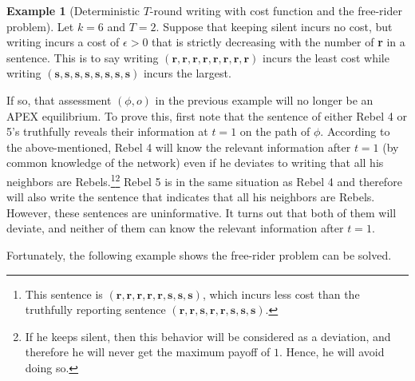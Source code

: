 \documentclass[12pt,letter]{article}
\newcommand\omicron{o}
\theoremstyle{definition}
\newtheorem{example}{Example}
\theoremstyle{remark}
\theoremstyle{claim}
\begin{document}
\begin{example}[Deterministic $T$-round writing with cost function and the free-rider problem]
\label{ex:cost_function_talk_fr}
Let $k=6$ and $T=2$. Suppose that keeping silent incurs no cost, but writing incurs a cost of  $\epsilon>0$ that is strictly decreasing with the number of \textbf{r} in a sentence. This is to say writing $(\textbf{r},\textbf{r},\textbf{r},\textbf{r},\textbf{r},\textbf{r},\textbf{r},\textbf{r})$ incurs the least cost while writing $(\textbf{s},\textbf{s},\textbf{s},\textbf{s},\textbf{s},\textbf{s},\textbf{s},\textbf{s})$ incurs the largest. 

If so, that assessment $(\phi, \omicron)$ in the previous example will no longer be an APEX equilibrium. To prove this, first note that the sentence of either Rebel 4 or 5's truthfully reveals their information at $t=1$ on the path of $\phi$. According to the above-mentioned, Rebel 4 will know the relevant information after $t=1$ (by common knowledge of the network) even if he deviates to writing that all his neighbors are Rebels.\footnote{This sentence is $(\textbf{r},\textbf{r},\textbf{r},\textbf{r},\textbf{r},\textbf{s},\textbf{s},\textbf{s})$, which incurs less cost than the truthfully reporting sentence $(\textbf{r},\textbf{r},\textbf{s},\textbf{r},\textbf{r},\textbf{s},\textbf{s},\textbf{s})$.}\footnote{If he keeps silent, then this behavior will be considered as a deviation, and therefore he will never get the maximum payoff of $1$. Hence, he will avoid doing so.}
Rebel 5 is in the same situation as Rebel 4 and therefore will also write the sentence that indicates that all his neighbors are Rebels. However, these sentences are uninformative. It turns out that both of them will deviate, and neither of them can know the relevant information after $t=1$.

Fortunately, the following example shows the free-rider problem can be solved. 
\end{example}
\end{document}
